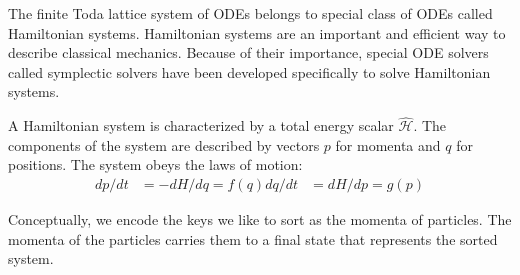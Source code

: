 \newcommand*{\hham}{\hat{\mathcal{H}}}
The finite Toda lattice system of ODEs belongs to special class of ODEs called Hamiltonian systems.
Hamiltonian systems are an important and efficient way to describe classical mechanics.
Because of their importance, special ODE solvers called symplectic solvers have been developed specifically to solve Hamiltonian systems.

A Hamiltonian system is characterized by a total energy scalar $\hham$.
The components of the system are described by vectors $p$ for momenta and $q$ for positions.
The system obeys the laws of motion:
\begin{align}
dp/dt &= -dH/dq = f(q)
dq/dt &= dH/dp = g(p)
\end{align}

Conceptually, we encode the keys we like to sort as the momenta of particles.
The momenta of the particles carries them to a final state that represents the sorted system.